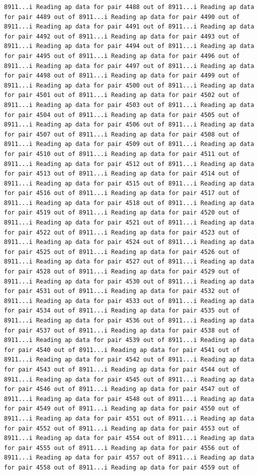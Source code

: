 \documentclass[
]{article}
\begin{document}
\begin{verbatim}
8911...i Reading ap data for pair 4488 out of 8911...i Reading ap data for pair 4489 out of 8911...i Reading ap data for pair 4490 out of 8911...i Reading ap data for pair 4491 out of 8911...i Reading ap data for pair 4492 out of 8911...i Reading ap data for pair 4493 out of 8911...i Reading ap data for pair 4494 out of 8911...i Reading ap data for pair 4495 out of 8911...i Reading ap data for pair 4496 out of 8911...i Reading ap data for pair 4497 out of 8911...i Reading ap data for pair 4498 out of 8911...i Reading ap data for pair 4499 out of 8911...i Reading ap data for pair 4500 out of 8911...i Reading ap data for pair 4501 out of 8911...i Reading ap data for pair 4502 out of 8911...i Reading ap data for pair 4503 out of 8911...i Reading ap data for pair 4504 out of 8911...i Reading ap data for pair 4505 out of 8911...i Reading ap data for pair 4506 out of 8911...i Reading ap data for pair 4507 out of 8911...i Reading ap data for pair 4508 out of 8911...i Reading ap data for pair 4509 out of 8911...i Reading ap data for pair 4510 out of 8911...i Reading ap data for pair 4511 out of 8911...i Reading ap data for pair 4512 out of 8911...i Reading ap data for pair 4513 out of 8911...i Reading ap data for pair 4514 out of 8911...i Reading ap data for pair 4515 out of 8911...i Reading ap data for pair 4516 out of 8911...i Reading ap data for pair 4517 out of 8911...i Reading ap data for pair 4518 out of 8911...i Reading ap data for pair 4519 out of 8911...i Reading ap data for pair 4520 out of 8911...i Reading ap data for pair 4521 out of 8911...i Reading ap data for pair 4522 out of 8911...i Reading ap data for pair 4523 out of 8911...i Reading ap data for pair 4524 out of 8911...i Reading ap data for pair 4525 out of 8911...i Reading ap data for pair 4526 out of 8911...i Reading ap data for pair 4527 out of 8911...i Reading ap data for pair 4528 out of 8911...i Reading ap data for pair 4529 out of 8911...i Reading ap data for pair 4530 out of 8911...i Reading ap data for pair 4531 out of 8911...i Reading ap data for pair 4532 out of 8911...i Reading ap data for pair 4533 out of 8911...i Reading ap data for pair 4534 out of 8911...i Reading ap data for pair 4535 out of 8911...i Reading ap data for pair 4536 out of 8911...i Reading ap data for pair 4537 out of 8911...i Reading ap data for pair 4538 out of 8911...i Reading ap data for pair 4539 out of 8911...i Reading ap data for pair 4540 out of 8911...i Reading ap data for pair 4541 out of 8911...i Reading ap data for pair 4542 out of 8911...i Reading ap data for pair 4543 out of 8911...i Reading ap data for pair 4544 out of 8911...i Reading ap data for pair 4545 out of 8911...i Reading ap data for pair 4546 out of 8911...i Reading ap data for pair 4547 out of 8911...i Reading ap data for pair 4548 out of 8911...i Reading ap data for pair 4549 out of 8911...i Reading ap data for pair 4550 out of 8911...i Reading ap data for pair 4551 out of 8911...i Reading ap data for pair 4552 out of 8911...i Reading ap data for pair 4553 out of 8911...i Reading ap data for pair 4554 out of 8911...i Reading ap data for pair 4555 out of 8911...i Reading ap data for pair 4556 out of 8911...i Reading ap data for pair 4557 out of 8911...i Reading ap data for pair 4558 out of 8911...i Reading ap data for pair 4559 out of 
\end{verbatim}
\end{document}
